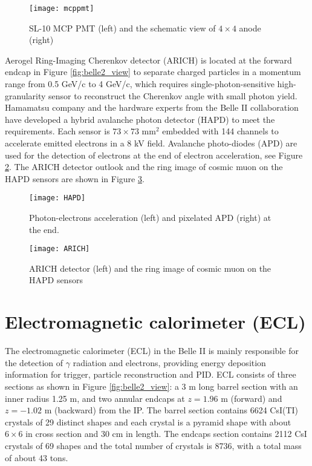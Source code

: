 \begin{figure}[htpb]
	\centering
	\texttt{[image: mcppmt]}
	\caption{SL-10 MCP PMT (left) and the schematic view of $4\times 4$ anode (right)\cite{Abe:2010gxa}}
	\label{fig:mcppmt}
\end{figure}

Aerogel Ring-Imaging Cherenkov
detector (ARICH) is located at the forward endcap in Figure \ref{fig:belle2_view} to separate charged particles in a momentum range from 0.5 GeV/c to 4 GeV/c, which requires single-photon-sensitive high-granularity sensor to reconstruct the Cherenkov angle with small photon yield.  
Hamamatsu company and the hardware experts from the Belle II collaboration have developed a hybrid avalanche photon detector (HAPD) to meet the requirements. Each sensor is $73 \times 73$ mm$^2$ embedded with 144 channels to accelerate emitted electrons in a 8 kV field. Avalanche photo-diodes (APD) are used for the detection of electrons at the end of electron acceleration, see Figure \ref{fig:arich_img}. The ARICH detector outlook and the ring image of cosmic muon on the HAPD sensors are shown in Figure \ref{fig:HAPD}.

\begin{figure}[htpb]
	\centering
	\texttt{[image: HAPD]}
	\caption{Photon-electrons acceleration (left) and pixelated APD (right) at the end\cite{Abe:2010gxa}.}
	\label{fig:arich_img}
\end{figure}



\begin{figure}[htpb]
	\centering
	\texttt{[image: ARICH]}
	\caption{ARICH detector (left) and the ring image of cosmic muon on the HAPD sensors\cite{b2book}}
	\label{fig:HAPD}
\end{figure}

\section{Electromagnetic calorimeter (ECL)}
The electromagnetic calorimeter (ECL) in the Belle II is mainly responsible for the detection of $\gamma$ radiation and electrons, providing energy deposition information for trigger, particle reconstruction and PID. ECL consists of three sections as shown in Figure \ref{fig:belle2_view}: a 3 m long barrel section with an inner radius 1.25 m, and two annular endcaps at $z = 1.96$ m (forward) and $z = -1.02$ m (backward) from the IP. The barrel section contains 6624 CsI(TI) crystals of 29 distinct shapes and each crystal is a pyramid shape with about $6\times 6$ in cross section and 30 cm in length. The endcaps section contains 2112 CsI crystals of 69 shapes and the total number of crystals is 8736, with a total
mass of about 43 tons\cite{Abe:2010gxa}.

